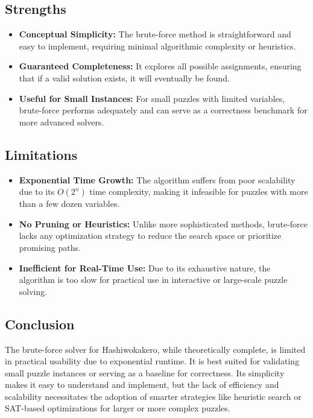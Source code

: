 \subsection*{Strengths}
\begin{itemize}
	\item \textbf{Conceptual Simplicity:} The brute-force method is straightforward and easy to implement, requiring minimal algorithmic complexity or heuristics.
	\item \textbf{Guaranteed Completeness:} It explores all possible assignments, ensuring that if a valid solution exists, it will eventually be found.
	\item \textbf{Useful for Small Instances:} For small puzzles with limited variables, brute-force performs adequately and can serve as a correctness benchmark for more advanced solvers.
\end{itemize}

\subsection*{Limitations}
\begin{itemize}
	\item \textbf{Exponential Time Growth:} The algorithm suffers from poor scalability due to its \(O(2^n)\) time complexity, making it infeasible for puzzles with more than a few dozen variables.
	\item \textbf{No Pruning or Heuristics:} Unlike more sophisticated methods, brute-force lacks any optimization strategy to reduce the search space or prioritize promising paths.
	\item \textbf{Inefficient for Real-Time Use:} Due to its exhaustive nature, the algorithm is too slow for practical use in interactive or large-scale puzzle solving.
\end{itemize}

\subsection*{Conclusion}
The brute-force solver for Hashiwokakero, while theoretically complete, is limited in practical usability due to exponential runtime. It is best suited for validating small puzzle instances or serving as a baseline for correctness. Its simplicity makes it easy to understand and implement, but the lack of efficiency and scalability necessitates the adoption of smarter strategies like heuristic search or SAT-based optimizations for larger or more complex puzzles.



